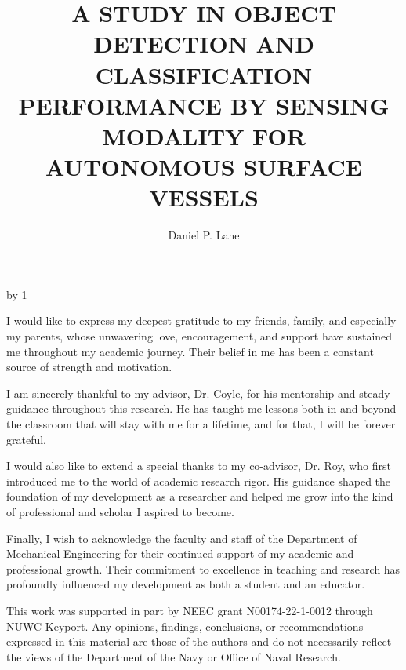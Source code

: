 \documentclass{erauthesis}
\title{A STUDY IN OBJECT DETECTION AND CLASSIFICATION
PERFORMANCE BY SENSING MODALITY FOR AUTONOMOUS
SURFACE VESSELS} %
\author{Daniel P. Lane}
\begin{document}
\frontmatter

\maketitle

\makeatletter 
\advance\fau@frontstage by 1  %


\begin{acknowledgements}
I would like to express my deepest gratitude to my friends, family, and especially my parents, whose unwavering love, encouragement, and support have sustained me throughout my academic journey. Their belief in me has been a constant source of strength and motivation.

I am sincerely thankful to my advisor, Dr. Coyle, for his mentorship and steady guidance throughout this research. He has taught me lessons both in and beyond the classroom that will stay with me for a lifetime, and for that, I will be forever grateful.

I would also like to extend a special thanks to my co-advisor, Dr. Roy, who first introduced me to the world of academic research rigor. His guidance shaped the foundation of my development as a researcher and helped me grow into the kind of professional and scholar I aspired to become.

Finally, I wish to acknowledge the faculty and staff of the Department of Mechanical Engineering for their continued support of my academic and professional growth. 
Their commitment to excellence in teaching and research has profoundly influenced my development as both a student and an educator.

\vspace{3mm}

This work was supported in part by NEEC grant N00174-22-1-0012 through NUWC Keyport.
Any opinions, findings, conclusions, or recommendations expressed in this material are those of the authors and do not necessarily reflect the views of the Department of the Navy or Office of Naval Research.
\end{acknowledgements}
\end{document}
